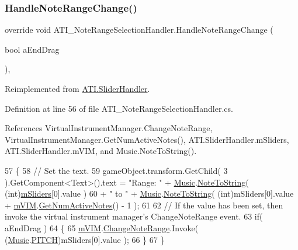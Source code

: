 \subsubsection{\texorpdfstring{Handle\+Note\+Range\+Change()}{HandleNoteRangeChange()}}
{\footnotesize\ttfamily override void A\+T\+I\+\_\+\+Note\+Range\+Selection\+Handler.\+Handle\+Note\+Range\+Change (\begin{DoxyParamCaption}\item[{bool}]{a\+End\+Drag }\end{DoxyParamCaption})\hspace{0.3cm}{\ttfamily [protected]}, {\ttfamily [virtual]}}



Reimplemented from \hyperlink{class_a_t_i_1_1_slider_handler_a4d3915be92feddd4c45027a71c3a338c}{A\+T\+I.\+Slider\+Handler}.



Definition at line 56 of file A\+T\+I\+\_\+\+Note\+Range\+Selection\+Handler.\+cs.



References Virtual\+Instrument\+Manager.\+Change\+Note\+Range, Virtual\+Instrument\+Manager.\+Get\+Num\+Active\+Notes(), A\+T\+I.\+Slider\+Handler.\+m\+Sliders, A\+T\+I.\+Slider\+Handler.\+m\+V\+IM, and Music.\+Note\+To\+String().


\begin{DoxyCode}
57     \{
58         \textcolor{comment}{// Set the text.}
59         gameObject.transform.GetChild( 3 ).GetComponent<Text>().text = \textcolor{stringliteral}{"Range: "} + 
      \hyperlink{class_music}{Music}.\hyperlink{group___music_stat_func_ga85a22c905d56d4c5f4e62159bfecee8c}{NoteToString}( (\textcolor{keywordtype}{int})\hyperlink{class_a_t_i_1_1_slider_handler_a038a487fbd701cb786e77c210830be76}{mSliders}[0].value )
60             + \textcolor{stringliteral}{" to "} + \hyperlink{class_music}{Music}.\hyperlink{group___music_stat_func_ga85a22c905d56d4c5f4e62159bfecee8c}{NoteToString}( (\textcolor{keywordtype}{int})mSliders[0].value + 
      \hyperlink{class_a_t_i_1_1_slider_handler_a5d19b4fb92b71c25a667defdda60213f}{mVIM}.\hyperlink{group___v_i_m_pub_func_ga3d6c823b1c1083eac8202f6c89e60b48}{GetNumActiveNotes}() - 1 );
61 
62         \textcolor{comment}{// If the value has been set, then invoke the virtual instrument manager's ChangeNoteRange event.}
63         \textcolor{keywordflow}{if}( aEndDrag )
64         \{
65             \hyperlink{class_a_t_i_1_1_slider_handler_a5d19b4fb92b71c25a667defdda60213f}{mVIM}.\hyperlink{group___v_i_m_events_gab6fa99d08e8466406835b9fc4ff859f1}{ChangeNoteRange}.Invoke( (\hyperlink{class_music}{Music}.\hyperlink{group___music_enums_ga508f69b199ea518f935486c990edac1d}{PITCH})mSliders[0].value );
66         \}
67     \}
\end{DoxyCode}
\mbox{\label{class_a_t_i___note_range_selection_handler_a0840b64bb232377676cdb9cef62349f4}} 
